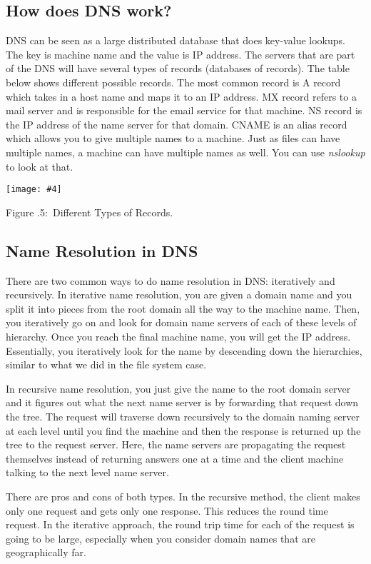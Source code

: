 \documentclass[twoside]{article}
\newcounter{lecnum}
\newcommand{\fig}[4]{
            \centerline{\texttt{[image: \#4]}}
            \begin{center}
            Figure \thelecnum.#1:~#3
            \end{center}
    }
\begin{document}
\subsection{How does DNS work?}
DNS can be seen as a large distributed database that does key-value lookups. The key is machine name and the value is IP address. The servers that are part of the DNS will have several types of records (databases of records). The table below shows different possible records. The most common record is A record which takes in a host name and maps it to an IP address. MX record refers to a mail server and is responsible for the email service for that machine. NS record is the IP address of the name server for that domain. CNAME is an alias record which allows you to give multiple names to a machine. Just as files can have multiple names, a machine can have multiple names as well. You can use \textit{nslookup} to look at that.

\fig{5}{0.5}{Different Types of Records.}{records.png}

\subsection{Name Resolution in DNS}
There are two common ways to do name resolution in DNS: iteratively and recursively. In iterative name resolution, you are given a domain name and you split it into pieces from the root domain all the way to the machine name. Then, you iteratively go on and look for domain name servers of each of these levels of hierarchy. Once you reach the final machine name, you will get the IP address. Essentially, you iteratively look for the name by descending down the hierarchies, similar to what we did in the file system case. 

In recursive name resolution, you just give the name to the root domain server and it figures out what the next name server is by forwarding that request down the tree. The request will traverse down recursively to the domain naming server at each level until you find the machine and then the response is returned up the tree to the request server. Here, the name servers are propagating the request themselves instead of returning answers one at a time and the client machine talking to the next level name server.

There are pros and cons of both types. In the recursive method, the client makes only one request and gets only one response. This reduces the round time request. In the iterative approach, the round trip time for each of the request is going to be large, especially when you consider domain names that are geographically far. 
\end{document}
